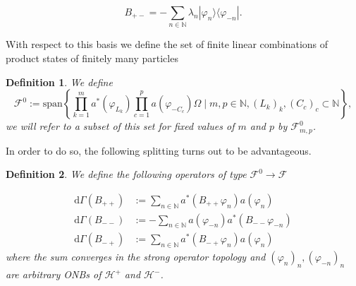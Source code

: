 \documentclass[b5paper,draft,openbib,12pt]{memoir}
\newtheorem{Def}{Definition}
\begin{document}
\begin{equation}
B_{+-} = -\sum_{n\in\mathbb{N}} \lambda_n |\varphi_{n}\rangle \langle \varphi_{-n}|.
\end{equation}

With respect to this basis we define the set of finite linear combinations of product states of finitely many particles

\begin{Def}
We define
\begin{equation}
\mathcal{F}^0\!\!:=\! \mathrm{span}\!\! \left\{\prod_{k=1}^m \!a^*\!(\varphi_{L_k}\!)\!\prod_{c=1}^p\!\! a(\varphi_{-C_c})\Omega\mid m,p\!\in\!\!\mathbb{N}, (L_k)_k,\!(C_c)_c\!\subset\!\mathbb{N} \!\right\}\!,
\end{equation}
we will refer to a subset of this set for fixed values of \(m\) and \(p\) by \(\mathcal{F}^0_{m,p}\).
\end{Def}

In order to do so, the following splitting turns out to be advantageous. 

\begin{Def}
We define the following operators of type \(\mathcal{F}^0\rightarrow \mathcal{F}\)

\begin{align}\label{predefdGamma}
\mathrm{d}\Gamma(B_{++})&:= \sum_{n\in\mathbb{N}}  a^*(B_{++} \varphi_n) a(\varphi_n) \\
\mathrm{d}\Gamma(B_{--})&:= -\sum_{n\in\mathbb{N}}   a(\varphi_{-n})a^*(B_{--} \varphi_{-n}) \\
\mathrm{d}\Gamma(B_{-+})&:= \sum_{n\in\mathbb{N}}  a^*(B_{-+}\varphi_{n}) a(\varphi_n)
\end{align}
where the sum converges in the strong operator topology and \((\varphi_n)_n , (\varphi_{-n})_n\) are arbitrary ONBs of \(\mathcal{H}^+\) and \(\mathcal{H}^-\).
\end{Def}
\end{document}
